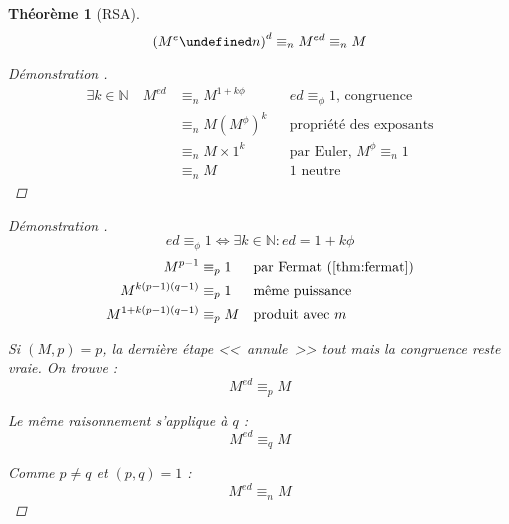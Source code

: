 \documentclass[11pt,twocolumn]{article}
\let\mod\undefined
\DeclareMathOperator{\mod}{mod}
\theoremstyle{plain}
\newtheorem{thm}{Théorème}
\newcommand{\esN}{\mathbb{N}} %
\newcommand{\dbi}{\Longleftrightarrow}
\newenvironment{cproof}[1]{\begin{proof}[Démonstration \cite{#1}]}{\end{proof}}
\begin{document}
\begin{thm}[RSA]
	\[
		\left(M^e \mod n\right)^d \equiv_n M^{ed} \equiv_n M
	\]
	\begin{cproof}{Buys}
		\begin{align*}
			\exists k \in \esN \quad M^{ed}
			&\equiv_n M^{1+k\phi}
				&& ed\equiv_\phi1 \text{, congruence} \\
			&\equiv_n M\left(M^\phi\right)^k
				&& \text{propriété des exposants} \\
			&\equiv_n M \times 1^k
				&& \text{par Euler, } M^\phi\equiv_n 1 \\
			&\equiv_n M
				&& \text{1 neutre}
		\end{align*}
	\end{cproof}
	\begin{cproof}{hac} ~
		\[
			ed\equiv_\phi1 \dbi \exists k \in \esN : ed=1+k\phi
		\]
		\begin{align*}
			M^{p-1} &\equiv_p 1
				&& \text{par Fermat (\ref{thm:fermat})} \\
			M^{k\left(p-1\right)\left(q-1\right)} &\equiv_p 1
				&& \text{même puissance} \\
			M^{1+k\left(p-1\right)\left(q-1\right)} &\equiv_p M
				&& \text{produit avec }m
		\end{align*}

		Si $(M,p)=p$, la dernière étape <<~annule~>> tout
		mais la congruence reste vraie. On trouve : \[
			M^{ed} \equiv_p M
		\]

		Le même raisonnement s'applique à $q$ : \[
			M^{ed} \equiv_q M
		\]

		Comme $p \neq q$ et $(p,q)=1$ : \[
			M^{ed} \equiv_n M
		\]
	\end{cproof}
\end{thm}
\end{document}
